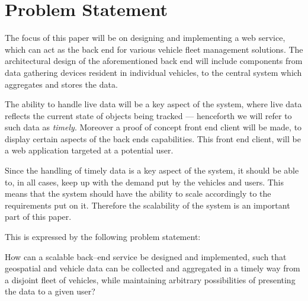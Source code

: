 \section{Problem Statement}\label{sec:problem_statement}

The focus of this paper will be on designing and implementing a web service,
which can act as the back end for various vehicle fleet management solutions.
The architectural design of the aforementioned back end will include components
from data gathering devices resident in individual vehicles,
to the central system which aggregates and stores the data.

The ability to handle live data will be a key aspect of the system,
where live data reflects the current state of objects being tracked
--- henceforth we will refer to such data as \textit{timely}.
Moreover a proof of concept front end client will be made,
to display certain aspects of the back ends capabilities.
This front end client, will be a web application targeted at a potential user.

Since the handling of timely data is a key aspect of the system,
it should be able to, in all cases, keep up with the demand put by the vehicles and users.
This means that the system should have the ability to scale accordingly to the requirements put on it.
Therefore the scalability of the system is an important part of this paper.

\bigskip\noindent
This is expressed by the following problem statement:

\medskip
{\addtolength{\leftskip}{10mm}\addtolength{\rightskip}{10mm}\noindent\hrulefill\it

\noindent How can a scalable back--end service be designed and implemented,
such that geospatial and vehicle data can be collected and aggregated in a timely way from a disjoint fleet of vehicles,
while maintaining arbitrary possibilities of presenting the data to a given user?

\noindent\hrulefill

}
